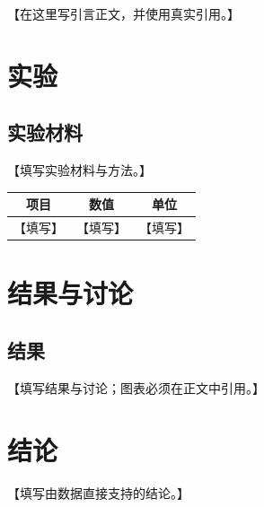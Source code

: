 \documentclass[UTF8,10pt]{ctexart}
\begin{document}
\makermfrontmatter

【在这里写引言正文，并使用真实引用\cite{example2026}。】

\section{实验}
\subsection{实验材料}
【填写实验材料与方法。】

\begin{table}[htbp]
  \centering
  \begin{tabular}{ccc}
    \toprule
    项目 & 数值 & 单位 \\
    \midrule
    【填写】 & 【填写】 & 【填写】 \\
    \bottomrule
  \end{tabular}
  \label{tab:example}
\end{table}

\section{结果与讨论}
\subsection{结果}
【填写结果与讨论；图表必须在正文中引用。】

\begin{figure}[htbp]
  \centering
  \fbox{\rule{0pt}{35mm}\rule{0.72\linewidth}{0pt}}
  \label{fig:example}
\end{figure}

\section{结论}
【填写由数据直接支持的结论。】

\begin{rmreferences}


\end{rmreferences}

\makermenglish
\makermmetadata
\end{document}

